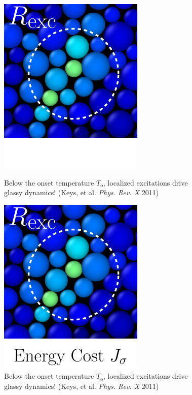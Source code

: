 \begin{frame}[t]
\begin{columns}[T]
\begin{column}[T]{0.5\textwidth}
\begin{figure}[t]
\begin{overprint}
\centering\includegraphics[height=0.525\textheight]{a.2-intro_dftheory/DF_Theory_Excitations_Zoom_1.pdf}\caption{Below the onset temperature $T_\mathrm{o}$, localized excitations drive glassy dynamics! (Keys, et al. \textit{Phys. Rev. X} 2011)}

\centering\includegraphics[height=0.525\textheight]{a.2-intro_dftheory/DF_Theory_Excitations_Zoom_2.pdf}\caption{Below the onset temperature $T_\mathrm{o}$, localized excitations drive glassy dynamics! (Keys, et al. \textit{Phys. Rev. X} 2011)}


\end{overprint}
\end{figure}

\end{column}
\begin{column}[T]{0.50\textwidth}


\end{column}
\end{columns}
\end{frame}
